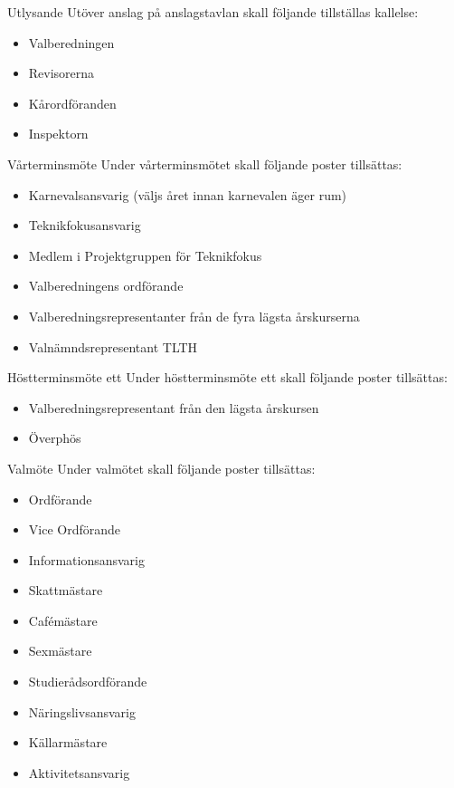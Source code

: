 \documentclass[pdfbookmarks,a4paper,11pt]{article}
\newlength{\itemcollength}
\newenvironment{reglemlista}{%
  \begin{list}{}{%
      \setlength{\labelwidth}{\itemcollength}%
      \setlength{\leftmargin}{\labelwidth + \labelsep}%
      \renewcommand{\makelabel}[1]{%
        \raisebox{0pt}[1ex][0pt]{%
          \makebox[\labelwidth][l]{%
            \parbox[t]{\itemcollength}{%
              \raggedright\hspace{0pt}##1}}}\hfill}%
      }}{%
  \end{list}}
\begin{document}
\begin{reglemlista}

  \item[Utlysande]
    Utöver anslag på anslagstavlan skall följande tillställas kallelse:
    \begin{itemize}
      \item Valberedningen
      \item Revisorerna
      \item Kårordföranden
      \item Inspektorn
    \end{itemize}

  \item[Vårterminsmöte]
    Under vårterminsmötet skall följande poster tillsättas:
    \begin{itemize}
    
      \item Karnevalsansvarig (väljs året innan karnevalen äger rum)
      \item Teknikfokusansvarig
      \item Medlem i Projektgruppen för Teknikfokus
      \item Valberedningens ordförande
      \item Valberedningsrepresentanter från de fyra lägsta årskurserna
      \item Valnämndsrepresentant TLTH
    \end{itemize}

  \item[Höstterminsmöte ett]
    Under höstterminsmöte ett skall följande poster tillsättas:
    \begin{itemize}
      \item Valberedningsrepresentant från den lägsta årskursen
      \item Överphös
    \end{itemize}

  \item[Valmöte]
   Under valmötet skall följande poster tillsättas:
    \begin{itemize}
      \item Ordförande
      \item Vice Ordförande
      \item Informationsansvarig
      \item Skattmästare
      \item Cafémästare
      \item Sexmästare
      \item Studierådsordförande
      \item Näringslivsansvarig
      \item Källarmästare
      \item Aktivitetsansvarig


\end{itemize}
\end{reglemlista}
\end{document}
